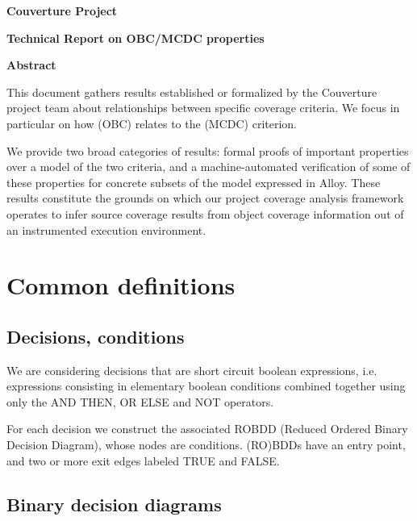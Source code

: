 \documentclass[a4paper,12pt,twoside]{article}
\begin{document}
\pagestyle{empty}

\vfill

\begin{center}%
{\Large \textbf{Couverture Project}}

{\Large \textbf{Technical Report on OBC/MCDC properties}}

\vfill

{\large \textbf{Abstract}}
\end{center}

This document gathers results established or formalized by the Couverture
project team about relationships between specific coverage criteria.
%
We focus in particular on how  (OBC) relates to the
 (MCDC) criterion.

We provide two broad categories of results: formal proofs of important
properties over a model of the two criteria, and a machine-automated
verification of some of these properties for concrete subsets of the model
expressed in Alloy.
%
These results constitute the grounds on which our project coverage analysis
framework operates to infer source coverage results from object coverage
information out of an instrumented execution environment.

\vfill

\newpage
\pagestyle{plain}


\section{Common definitions}

\subsection{Decisions, conditions}

We are considering decisions that are short circuit boolean expressions,
i.e. expressions consisting in elementary boolean conditions combined
together using only the AND THEN, OR ELSE and NOT operators.

For each decision we construct the associated ROBDD (Reduced Ordered
Binary Decision Diagram), whose nodes are conditions. (RO)BDDs have an
entry point, and two or more exit edges labeled TRUE and FALSE.

\subsection{Binary decision diagrams}
\end{document}
